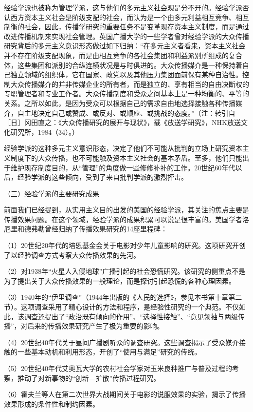 \documentclass[UTF8,12pt]{ctexart}
\numberwithin{equation}{section} %
\numberwithin{figure}{section}
\numberwithin{table}{section}
\begin{document}
	经验学派也被称为管理学派，这与他们的多元主义社会观是分不开的。经验学派否认西方资本主义社会是阶级支配的社会，而认为是一个由多元利益相互竞争、相互制衡的社会，因此，传播学研究的重要任务不是变革现存资本主义制度，而是通过改进传播机制来实现社会管理。英国广播大学的一些学者曾对经验学派的大众传播研究背后的多元主义意识形态做过如下归纳：“在多元主义者看来，资本主义社会并不存在阶级支配现象，而是由相互竞争的各社会集团和利益派别所组成的复合体，这些集团和派别的合纵连横状况是与时俱进的。大众传播媒介是一种保持着自己独立领域的组织体，它在国家、政党以及其他压力集团面前保有某种自治性。控制大众传播媒介的并非传媒企业的所有者，而是独立的、享有相当的自由决断权的专职管理者和专业工作者。大众传播制度和受众之间基本上是一种均衡的、平等的关系。之所以如此，是因为受众可以根据自己的需求自由地选择接触各种传播媒介，自主地决定自己或赞成、或反对、或顺应、或挑战的态度。”（注：转引自［日］冈田直之：《大众传播研究的展开与现状》，载《放送学研究》，NHK放送文化研究所，1984（34）。）
	
	经验学派的这种多元主义意识形态，决定了他们不可能从批判的立场上研究资本主义制度下的大众传播，也不可能触及资本主义社会的基本矛盾。至多，他们只能出于维护现存制度目的，从“管理”的角度做一些修修补补的工作。20世纪60年代以后，经验学派的这些倾向，受到了来自批判学派的激烈抨击。
	
	（三）经验学派的主要研究成果
	
	前面我们已经提到，从实用主义目的出发的美国的经验学派，其关注的焦点主要是传播效果问题。在这个领域，经验学派的成果积累可以说是很丰富的。美国学者洛厄里和德弗勒曾经归纳了传播效果研究的14座里程碑：
	
	（1）20世纪20年代的培恩基金会关于电影对少年儿童影响的研究。这项研究开创了以经验调查方式考察大众传播效果的先河。
	
	（2）对1938年“火星人入侵地球”广播引起的社会恐慌研究。该研究的侧重点不是为了提出关于大众传播效果的一般理论，而是探讨引起恐慌的各种心理因素。
	
	（3）1940年的“伊里调查”（1944年出版的《人民的选择》，参见本书第十章第二节）。这项调查采用了精心设计的方法和程序，是经验性研究的一个典范。不仅如此，该调查还提出了“政治既有倾向的作用”、“选择性接触”、“意见领袖与两级传播”，对后来的传播效果研究产生了极为重要的影响。
	
	（4）20世纪40年代关于昼间广播剧听众的调查研究。这些调查揭示了受众媒介接触的一些基本动机和利用形态，开创了“使用与满足”研究的传统。
	
	（5）20世纪40年代艾奥瓦大学的农村社会学家对玉米良种推广与普及过程的考察，推动了对新事物的“创新—扩散”传播过程研究。
	
	（6）霍夫兰等人在第二次世界大战期间关于电影的说服效果的实验，揭示了传播效果形成的条件性和制约因素。
	
\end{document}
